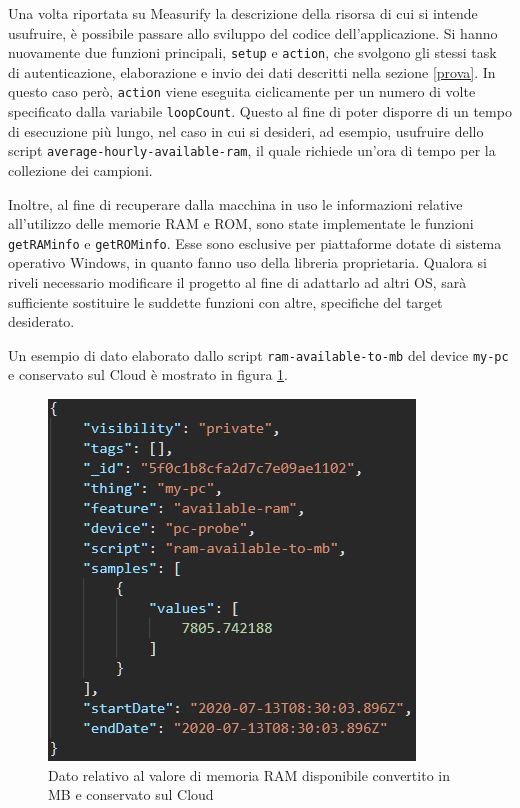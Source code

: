 Una volta riportata su Measurify la descrizione della risorsa di cui si intende usufruire, è possibile passare allo sviluppo del codice dell'applicazione. Si hanno nuovamente due funzioni principali, \texttt{setup} e \texttt{action}, che svolgono gli stessi task di autenticazione, elaborazione e invio dei dati descritti nella sezione \ref{prova}. In questo caso però, \texttt{action} viene eseguita ciclicamente per un numero di volte specificato dalla variabile \texttt{loopCount}. Questo al fine di poter disporre di un tempo di esecuzione più lungo, nel caso in cui si desideri, ad esempio, usufruire dello script \texttt{average-hourly-available-ram}, il quale richiede un'ora di tempo per la collezione dei campioni.

Inoltre, al fine di recuperare dalla macchina in uso le informazioni relative all'utilizzo delle memorie RAM e ROM, sono state implementate le funzioni \texttt{getRAMinfo} e  \texttt{getROMinfo}. Esse sono esclusive per piattaforme dotate di sistema operativo Windows, in quanto fanno uso della libreria proprietaria. Qualora si riveli necessario modificare il progetto al fine di adattarlo ad altri OS, sarà sufficiente sostituire le suddette funzioni con altre, specifiche del target desiderato.

Un esempio di dato elaborato dallo script \texttt{ram-available-to-mb} del device \texttt{my-pc} e conservato sul Cloud è mostrato in figura \ref{datowin}.

\begin{figure}[H]
	\centering
	\includegraphics[scale=0.7]{pics/datowin}
	\caption{Dato relativo al valore di memoria RAM disponibile convertito in MB e conservato sul Cloud}
	\label{datowin}
\end{figure}

